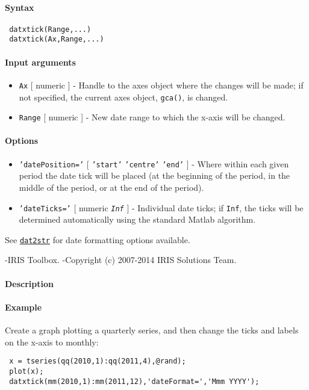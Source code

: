 


	\paragraph{Syntax}
 
 \begin{verbatim}
 datxtick(Range,...)
 datxtick(Ax,Range,...)
 \end{verbatim}
 
 \paragraph{Input arguments}
 
 \begin{itemize}
 \item
   \texttt{Ax} {[} numeric {]} - Handle to the axes object where the
   changes will be made; if not specified, the current axes object,
   \texttt{gca()}, is changed.
 \item
   \texttt{Range} {[} numeric {]} - New date range to which the x-axis
   will be changed.
 \end{itemize}
 
 \paragraph{Options}
 
 \begin{itemize}
 \item
   \texttt{'datePosition='} {[} \texttt{'start'} \textbar{}
   \texttt{'centre'} \textbar{} \texttt{'end'} {]} - Where within each
   given period the date tick will be placed (at the beginning of the
   period, in the middle of the period, or at the end of the period).
 \item
   \texttt{'dateTicks='} {[} numeric \textbar{} \emph{\texttt{Inf}} {]} -
   Individual date ticks; if \texttt{Inf}, the ticks will be determined
   automatically using the standard Matlab algorithm.
 \end{itemize}
 
 See \href{dates/dat2str}{\texttt{dat2str}} for date formatting options
 available.
 
 -IRIS Toolbox. -Copyright (c) 2007-2014 IRIS Solutions Team.
 
 \paragraph{Description}
 
 \paragraph{Example}
 
 Create a graph plotting a quarterly series, and then change the ticks
 and labels on the x-axis to monthly:
 
 \begin{verbatim}
 x = tseries(qq(2010,1):qq(2011,4),@rand);
 plot(x);
 datxtick(mm(2010,1):mm(2011,12),'dateFormat=','Mmm YYYY');
 \end{verbatim}


